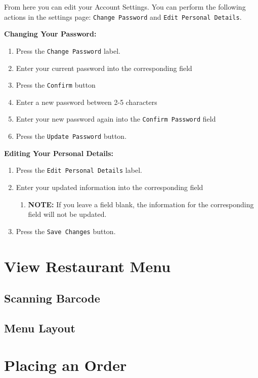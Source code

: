 \documentclass[12pt, titlepage]{article}
\begin{document}
From here you can edit your Account Settings. You can perform the following actions in the settings page: \texttt{Change Password} and \texttt{Edit Personal Details}.

\textbf{Changing Your Password:}
	\begin{enumerate}
		\item Press the \texttt{Change Password} label.
		\item Enter your current password into the corresponding field
		\item Press the \texttt{Confirm} button
		\item Enter a new password between 2-5 characters
		\item Enter your new password again into the \texttt{Confirm Password} field
		\item Press the \texttt{Update Password} button.
	\end{enumerate}
	
\textbf{Editing Your Personal Details:}
	\begin{enumerate}
		\item Press the \texttt{Edit Personal Details} label.
		\item Enter your updated information into the corresponding field
		\begin{enumerate}
			\item \textbf{NOTE:} If you leave a field blank, the 						information for the corresponding field will not be updated.
		\end{enumerate}
		\item Press the \texttt{Save Changes} button.
	\end{enumerate}
\section{View Restaurant Menu}
\subsection{Scanning Barcode}
\subsection{Menu Layout}

\section{Placing an Order}
\end{document}
